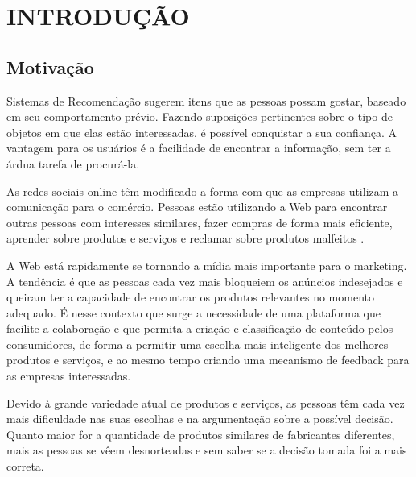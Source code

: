 \chapter{INTRODUÇÃO}  %
\label{cha:introducao}

\section{Motivação} %
\label{sec:motivacao}




 Sistemas de Recomendação sugerem itens que as pessoas possam gostar, baseado em seu comportamento prévio. Fazendo suposições pertinentes sobre o tipo de objetos em que elas estão interessadas, é possível conquistar a sua confiança. A vantagem para os usuários é a facilidade de encontrar a informação, sem ter a árdua tarefa de procurá-la.

 As redes sociais online têm modificado a forma com que as empresas utilizam a comunicação para o comércio. Pessoas estão utilizando a Web para encontrar outras pessoas com interesses similares, fazer compras de forma mais eficiente, aprender sobre produtos e serviços e reclamar sobre produtos malfeitos \cite{marketing_social_web}.

 A Web está rapidamente se tornando a mídia mais importante para o marketing. A tendência é que as pessoas cada vez mais bloqueiem os anúncios indesejados e queiram ter a capacidade de encontrar os produtos relevantes no momento adequado. É nesse contexto que surge a necessidade de uma plataforma que facilite a colaboração e que permita a criação e classificação de conteúdo pelos consumidores, de forma a permitir uma escolha mais inteligente dos melhores produtos e serviços, e ao mesmo tempo criando uma mecanismo de feedback para as empresas interessadas.

 Devido à grande variedade atual de produtos e serviços, as pessoas têm cada vez mais dificuldade nas suas escolhas e na argumentação sobre a possível decisão. Quanto maior for a quantidade de produtos similares de fabricantes diferentes, mais as pessoas se vêem desnorteadas e sem saber se a decisão tomada foi a mais correta.

